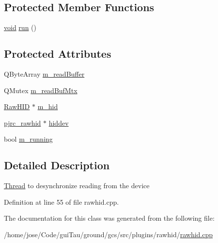 \subsection*{Protected Member Functions}
\begin{DoxyCompactItemize}
\item 
\hyperlink{group___u_a_v_objects_plugin_ga444cf2ff3f0ecbe028adce838d373f5c}{void} \hyperlink{group___raw_h_i_d_plugin_ga1f533b47a0fb6382c542a4fa5b344d2a}{run} ()
\end{DoxyCompactItemize}
\subsection*{Protected Attributes}
\begin{DoxyCompactItemize}
\item 
Q\-Byte\-Array \hyperlink{group___raw_h_i_d_plugin_gaab5037bdcaa413fed7fea8c575861b1b}{m\-\_\-read\-Buffer}
\item 
Q\-Mutex \hyperlink{group___raw_h_i_d_plugin_ga5b3754efb963cd7171d34683320c01eb}{m\-\_\-read\-Buf\-Mtx}
\item 
\hyperlink{class_raw_h_i_d}{Raw\-H\-I\-D} $\ast$ \hyperlink{group___raw_h_i_d_plugin_gae4904e50399d18b7cce82e865d43dcbc}{m\-\_\-hid}
\item 
\hyperlink{classpjrc__rawhid}{pjrc\-\_\-rawhid} $\ast$ \hyperlink{group___raw_h_i_d_plugin_ga1a4a37b6308c6b835b62ea90dc2a37f9}{hiddev}
\item 
bool \hyperlink{group___raw_h_i_d_plugin_ga0b977a016ba6a452e9bdf1d49e2d89e3}{m\-\_\-running}
\end{DoxyCompactItemize}


\subsection{Detailed Description}
\hyperlink{class_thread}{Thread} to desynchronize reading from the device 

Definition at line 55 of file rawhid.\-cpp.



The documentation for this class was generated from the following file\-:\begin{DoxyCompactItemize}
\item 
/home/jose/\-Code/gui\-Tau/ground/gcs/src/plugins/rawhid/\hyperlink{rawhid_8cpp}{rawhid.\-cpp}\end{DoxyCompactItemize}
